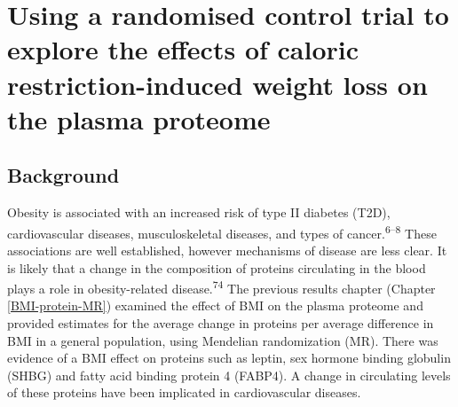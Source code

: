 \documentclass[11pt,twoside]{bristolthesis}
\begin{document}
\hypertarget{BMI-protein-RCT}{%
\chapter{Using a randomised control trial to explore the effects of caloric restriction-induced weight loss on the plasma proteome}\label{BMI-protein-RCT}}

\hypertarget{background-4}{%
\section{Background}\label{background-4}}

Obesity is associated with an increased risk of type II diabetes (T2D), cardiovascular diseases, musculoskeletal diseases, and types of cancer.\textsuperscript{6--8} These associations are well established, however mechanisms of disease are less clear. It is likely that a change in the composition of proteins circulating in the blood plays a role in obesity-related disease.\textsuperscript{74} The previous results chapter (Chapter \ref{BMI-protein-MR}) examined the effect of BMI on the plasma proteome and provided estimates for the average change in proteins per average difference in BMI in a general population, using Mendelian randomization (MR). There was evidence of a BMI effect on proteins such as leptin, sex hormone binding globulin (SHBG) and fatty acid binding protein 4 (FABP4). A change in circulating levels of these proteins have been implicated in cardiovascular diseases.
\end{document}
